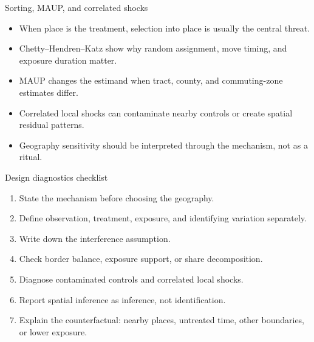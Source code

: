 \documentclass[aspectratio=169,11pt]{beamer}
\newcommand{\1}{\mathbf{1}}
\begin{document}
\begin{frame}{Sorting, MAUP, and correlated shocks}
\begin{itemize}
    \item When place is the treatment, selection into place is usually the central threat.
    \item Chetty--Hendren--Katz show why random assignment, move timing, and exposure duration matter.
    \item MAUP changes the estimand when tract, county, and commuting-zone estimates differ.
    \item Correlated local shocks can contaminate nearby controls or create spatial residual patterns.
    \item Geography sensitivity should be interpreted through the mechanism, not as a ritual.
\end{itemize}
\end{frame}

\begin{frame}{Design diagnostics checklist}
\small
\begin{enumerate}
    \item State the mechanism before choosing the geography.
    \item Define observation, treatment, exposure, and identifying variation separately.
    \item Write down the interference assumption.
    \item Check border balance, exposure support, or share decomposition.
    \item Diagnose contaminated controls and correlated local shocks.
    \item Report spatial inference as inference, not identification.
    \item Explain the counterfactual: nearby places, untreated time, other boundaries, or lower exposure.
\end{enumerate}
\end{frame}
\end{document}
